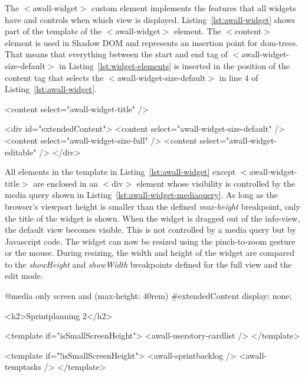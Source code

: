 \documentclass{sigchi}
\begin{document}
The $<$awall-widget$>$ custom element implements the features that all widgets have and controls when which view is displayed.
Listing~\ref{lst:awall-widget} shows part of the template of the $<$awall-widget$>$ element.
The $<$content$>$ element is used in Shadow DOM and represents an insertion point for \gls{dom}-trees.
That means that everything between the start and end tag of $<$awall-widget-size-default$>$ in Listing~\ref{lst:widget-elements} is inserted in the position of the content tag that selects the $<$awall-widget-size-default$>$ in line 4 of Listing~\ref{lst:awall-widget}.


\begin{code}[caption={Part of the $<$awall-widget$>$'s template using insertion points for the different HTML tags.},label=lst:awall-widget]
<content select="awall-widget-title" />

<div id="extendedContent">
  <content select="awall-widget-size-default" />
  <content select="awall-widget-size-full" />
  <content select="awall-widget-editable" />
</div>
\end{code}


All elements in the template in Listing~\ref{lst:awall-widget} except $<$awall-widget-title$>$ are enclosed in an $<$div$>$ element whose visibility is controlled by the media query shown in Listing~\ref{lst:awall-widget-mediaquery}.
As long as the browser's viewport height is smaller than the defined \textit{max-height} breakpoint, only the title of the widget is shown.
When the widget is dragged out of the info-view, the default view becomes visible. This is not controlled by a media query but by Javascript code.
The widget can now be resized using the pinch-to-zoom gesture or the mouse.
During resizing, the width and height of the widget are compared to the \textit{showHeight} and \textit{showWidth} breakpoints defined for the full view and the edit mode.

\begin{code}[caption={Media Query hiding all the views except the title when the screen is small enough.},label=lst:awall-widget-mediaquery]
@media only screen and (max-height: 40rem) {
  #extendedContent {
    display: none;
  }
}
\end{code}

\begin{code}[caption={How the \gls{sp2} main widget decides which view to show.},label=lst:sp2-template]
	<h2>Sprintplanning 2</h2>
	
	<template if="{{isSmallScreenHeight}}">
	<awall-userstory-cardlist />
	</template>
	
	<template if="{{!isSmallScreenHeight}}">
	<awall-sprintbacklog />
	<awall-temptasks />
	</template>
\end{code}
\end{document}
